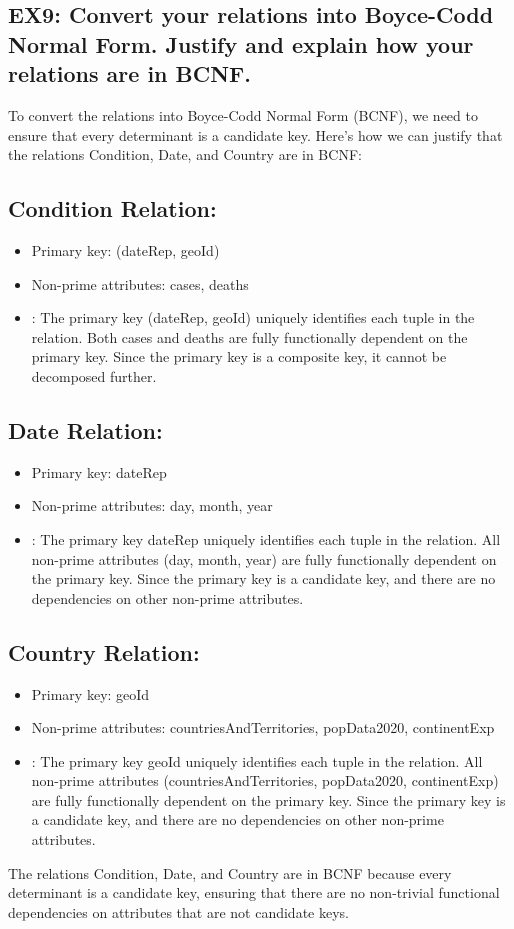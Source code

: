 \documentclass{article}
\begin{document}
\subsection*{EX9: Convert your relations into Boyce-Codd Normal Form. Justify and explain how your relations are in BCNF.}

To convert the relations into Boyce-Codd Normal Form (BCNF), we need to ensure that every determinant is a candidate key. Here's how we can justify that the relations Condition, Date, and Country are in BCNF:

\subsection*{\small Condition Relation:}
\begin{itemize}
    \item Primary key: (dateRep, geoId)
    \item Non-prime attributes: cases, deaths
    \item {}: The primary key (dateRep, geoId) uniquely identifies each tuple in the relation. Both cases and deaths are fully functionally dependent on the primary key. Since the primary key is a composite key, it cannot be decomposed further.
\end{itemize}

\subsection*{\small Date Relation:}
\begin{itemize}
    \item Primary key: dateRep
    \item Non-prime attributes: day, month, year
    \item {}: The primary key dateRep uniquely identifies each tuple in the relation. All non-prime attributes (day, month, year) are fully functionally dependent on the primary key. Since the primary key is a candidate key, and there are no dependencies on other non-prime attributes.
\end{itemize}

\subsection*{\small Country Relation:}
\begin{itemize}
    \item Primary key: geoId
    \item Non-prime attributes: countriesAndTerritories, popData2020, continentExp
    \item {}: The primary key geoId uniquely identifies each tuple in the relation. All non-prime attributes (countriesAndTerritories, popData2020, continentExp) are fully functionally dependent on the primary key. Since the primary key is a candidate key, and there are no dependencies on other non-prime attributes.
\end{itemize}
The relations Condition, Date, and Country are in BCNF because every determinant is a candidate key, ensuring that there are no non-trivial functional dependencies on attributes that are not candidate keys.
\end{document}
